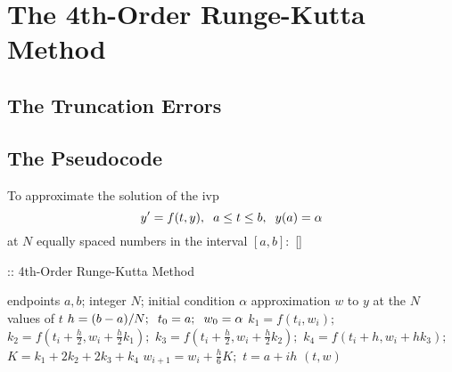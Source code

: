 \documentclass[12pt,oneside]{book}
\begin{document}
		\clearpage
	\section{The 4th-Order Runge-Kutta Method} \label{m:rk4}
		\begin{spacing}{1.2}
			
			
			
			\subsection*{The Truncation Errors}
			
			
			\subsection*{The Pseudocode}
				To approximate the solution of the \ac{ivp} 
				\[ y' = f(t,y), \hspace*{0.2cm} a \leq t \leq b, \hspace*{0.2cm} y(a) = \alpha \]
				at $ N $ equally spaced numbers in the interval $ [a, b]: $ []
				
				\begin{algorithm}[H]
					\caption{:: 4th-Order Runge-Kutta Method}
					\begin{algorithmic}[1]
						\REQUIRE endpoints $ a, b $; \hspace*{0.2cm} integer $ N $; \hspace*{0.2cm} initial condition $ \alpha $
						\ENSURE approximation $ w $ to $ y $ at the $ N $ values of $ t $
						\STATE $ h = (b - a) / N; \hspace*{0.2cm} t_0 = a; \hspace*{0.2cm} w_{0} = \alpha $
						\STATE $ k_{1} = f(t_{i},w_{i}); $ \hspace*{0.5cm} 
						\STATE $ k_{2} = f\left(t_{i} + \frac{h}{2}, w_{i} + \frac{h}{2}k_{1}\right); $
						\STATE $ k_{3} = f\left(t_{i} + \frac{h}{2}, w_{i} + \frac{h}{2}k_{2}\right); $
						\STATE $ k_{4} = f\left(t_{i} + h, w_{i} + hk_{3}\right); $
						\STATE $ K = k_{1} + 2k_{2} + 2k_{3} + k_{4}  $
						\STATE $ w_{i+1} = w_{i} + \frac{h}{6}K; $ \hspace*{0.5cm} 
						\STATE $ t = a + ih $ \hspace*{0.5cm} 
						\ENDFOR
						\RETURN $ (t, w) $
					\end{algorithmic}
				\end{algorithm}
			
		\end{spacing}
		
\end{document}
